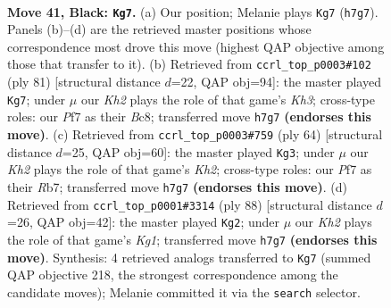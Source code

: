 \documentclass[11pt]{article}
\begin{document}
\clearpage

\begin{figure}[p]\centering
\begin{subfigure}{0.46\textwidth}\centering
\resizebox{\linewidth}{!}{%
\newchessgame
\chessboard[
  setfen={1r6/1p3p1k/pR2p3/6K1/P3P3/5P1P/7P/4R3 b - - 12 41},
  showmover=false,
  pgfstyle=straightmove, color=movearrow, markmove={h7-g7}
]}
\caption{}
\end{subfigure}\hfill
\begin{subfigure}{0.46\textwidth}\centering
\resizebox{\linewidth}{!}{%
\newchessgame
\chessboard[
  setfen={2b5/p3rp2/5Rpk/1P6/P6p/8/5P1K/1R6 b - - 5 41},
  showmover=false,
  pgfstyle=straightmove, color=movearrow, markmove={h6-g7}
]}
\caption{}
\end{subfigure}
\\[4pt]
\begin{subfigure}{0.46\textwidth}\centering
\resizebox{\linewidth}{!}{%
\newchessgame
\chessboard[
  setfen={8/1R3p2/2pk4/7p/6pP/1P6/r1P2rPK/2R5 w - - 2 33},
  showmover=false,
  pgfstyle=straightmove, color=movearrow, markmove={h2-g3}
]}
\caption{}
\end{subfigure}\hfill
\begin{subfigure}{0.46\textwidth}\centering
\resizebox{\linewidth}{!}{%
\newchessgame
\chessboard[
  setfen={R7/5pk1/4p3/4P1p1/P5Pp/r4P1P/8/6K1 w - - 6 45},
  showmover=false,
  pgfstyle=straightmove, color=movearrow, markmove={g1-g2}
]}
\caption{}
\end{subfigure}
\caption{\textbf{Move 41, Black: \texttt{Kg7}.} (a) Our position; Melanie plays \texttt{Kg7} (\texttt{h7g7}). Panels (b)--(d) are the retrieved master positions whose correspondence most drove this move (highest QAP objective among those that transfer to it). (b) Retrieved from \texttt{ccrl\_top\_p0003\#102} (ply 81) [structural distance $d$=22, QAP obj=94]: the master played \texttt{Kg7}; under $\mu$ our \emph{Kh2} plays the role of that game's \emph{Kh3}; cross-type roles: our \emph{P}f7 as their \emph{B}c8; transferred move \texttt{h7g7} \textbf{(endorses this move)}. (c) Retrieved from \texttt{ccrl\_top\_p0003\#759} (ply 64) [structural distance $d$=25, QAP obj=60]: the master played \texttt{Kg3}; under $\mu$ our \emph{Kh2} plays the role of that game's \emph{Kh2}; cross-type roles: our \emph{P}f7 as their \emph{R}b7; transferred move \texttt{h7g7} \textbf{(endorses this move)}. (d) Retrieved from \texttt{ccrl\_top\_p0001\#3314} (ply 88) [structural distance $d$=26, QAP obj=42]: the master played \texttt{Kg2}; under $\mu$ our \emph{Kh2} plays the role of that game's \emph{Kg1}; transferred move \texttt{h7g7} \textbf{(endorses this move)}. Synthesis: 4 retrieved analogs transferred to \texttt{Kg7} (summed QAP objective 218, the strongest correspondence among the candidate moves); Melanie committed it via the \texttt{search} selector.}
\label{fig:thought-m81}
\end{figure}
\end{document}
